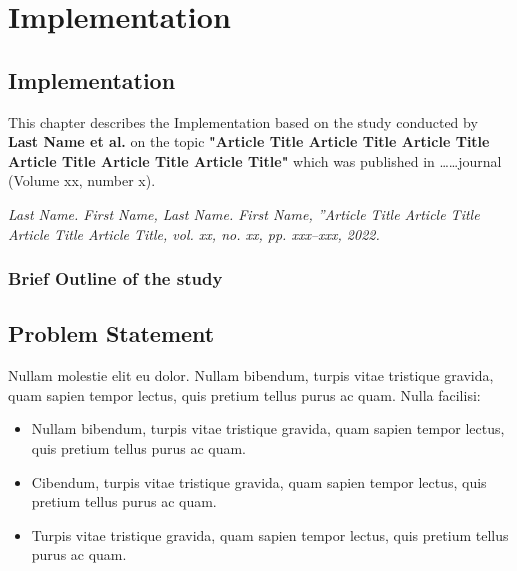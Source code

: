 
\chapter{Implementation}\doublespacing %

\label{Chapter6} %



\section{Implementation}
This chapter describes the Implementation based on the study conducted by \textbf{Last Name et al.} on the topic \textbf{ "Article Title Article Title Article Title Article Title Article Title Article Title" } which was published in \ldots \ldots journal (Volume xx, number x).


\textit{Last Name. First Name, Last Name. First Name, ”Article Title Article Title Article Title Article
Title, vol. xx, no. xx, pp. xxx–xxx, 2022.}


\subsection{Brief Outline of the study}
\lipsum[22-25]



\section{Problem Statement}
Nullam molestie elit eu dolor. Nullam bibendum, turpis vitae tristique gravida, quam sapien tempor lectus, quis pretium tellus purus ac quam. Nulla facilisi: 

\begin{itemize}

  \item Nullam bibendum, turpis vitae tristique gravida, quam sapien tempor lectus, quis pretium tellus purus ac quam.
  
  \item Cibendum, turpis vitae tristique gravida, quam sapien tempor lectus, quis pretium tellus purus ac quam.
  
  \item Turpis vitae tristique gravida, quam sapien tempor lectus, quis pretium tellus purus ac quam. 
  
\end{itemize}

